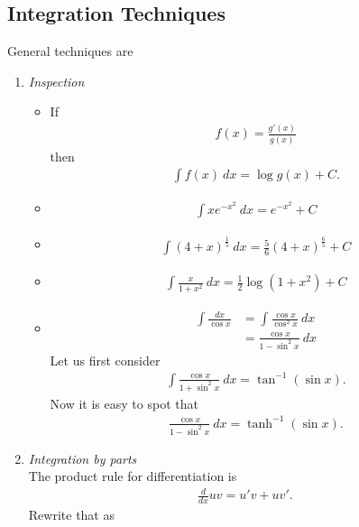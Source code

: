 \subsection{Integration Techniques}
General techniques are
\begin{enumerate}
	\item
	\emph{Inspection} 
	\begin{ex}
		\begin{itemize}
			\item
			If 
			\begin{align*}
			f(x) = \frac{g'(x)}{g(x)}
			\end{align*}
			then
			\begin{align*}
			\int f(x) ~ dx = \log g(x) +C.
			\end{align*}
			\item
		\begin{align*}
			\int x e^{-x^2} ~ dx = e^{-x^2} +C 
		\end{align*}
		\item
		\begin{align*}
		\int (4+x)^{\frac 1 5} ~ dx = \frac 5 6 (4+x)^{\frac 6 5} +C
		\end{align*}
		\item
		\begin{align*}
		\int \frac x {1+x^2} ~dx = \frac 1 2 \log (1+x^2) +C
		\end{align*}
		\item
		\begin{align*}
		\int \frac{dx}{\cos x } & = \int \frac{\cos x}{\cos^2 x} ~dx \\
		& = \frac{\cos x }{1-\sin^2 x} ~dx 
		\end{align*}
		Let us first consider
		\begin{align*}
		\int \frac{\cos x }{1+ \sin^2 x} ~dx = \tan^{-1}(\sin x).
		\end{align*}
		Now it is easy to spot that 
		\begin{align*}
		\frac{\cos x }{1-\sin^2 x} ~dx = \tanh^{-1}(\sin x).
		\end{align*}
	\end{itemize}
	\end{ex}
	\item
	\emph{Integration by parts} \\
	The product rule for differentiation is
	\begin{align*}
	\frac d {dx} uv = u'v + uv'.
	\end{align*}
	Rewrite that as
	\begin{align*}

\end{align*}
\end{enumerate}
